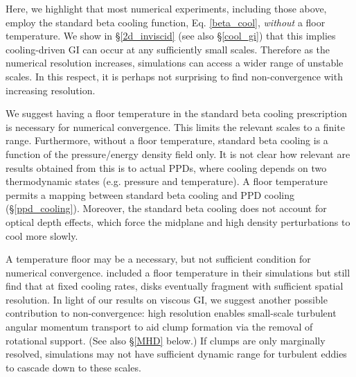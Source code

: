 Here, we highlight that most numerical experiments, including those
above, employ the standard beta cooling function, Eq. \ref{beta_cool},
\emph{without} a floor temperature. We show in \S\ref{2d_inviscid}
(see also \S\ref{cool_gi}) that this implies cooling-driven GI can
occur at any sufficiently small scales. Therefore as the numerical
resolution increases, simulations can access a wider range of unstable
scales.  %
In this respect, it is perhaps not surprising to find non-convergence with 
increasing resolution. %

We suggest having a floor temperature in the standard beta
cooling prescription is  necessary for  
numerical convergence. This limits the
relevant scales to a finite range.  %
Furthermore, without a floor temperature, standard beta cooling is
a function of the pressure/energy density field only. It is not clear
how relevant are results obtained from this is to actual PPDs,
where cooling depends on two thermodynamic states (e.g. pressure and
temperature). A floor temperature permits a mapping between standard beta
cooling and PPD cooling (\S\ref{ppd_cooling}). 
Moreover, the standard beta cooling does 
not account for optical depth effects, which force the midplane 
and high density perturbations to cool more slowly.

%


A temperature floor may be a necessary, but not sufficient condition
for numerical convergence. \cite{baehr15} included a floor temperature 
in their simulations but still find that at fixed cooling rates, disks
eventually fragment with sufficient spatial resolution.
In light of our results on viscous GI, 
we suggest another possible contribution to non-convergence: %
high resolution enables small-scale turbulent angular momentum transport 
to aid clump formation via the removal of rotational support. (See also \S\ref{MHD} below.) 
If clumps are only marginally resolved, simulations may not have sufficient dynamic range for turbulent eddies
to cascade down to these scales.

